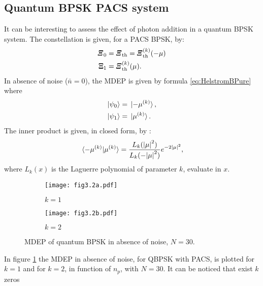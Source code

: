     \subsection{Quantum BPSK PACS system}
    It can be interesting to assess the effect of photon addition in a quantum BPSK system.
    The constellation is given, for a PACS BPSK, by:
    \begin{equation}\begin{split}
        \Operator{\varXi}_0 &=  \Operator{\varXi}_{\mathrm{th}} = \Operator{\varXi}_{\mathrm{th}}^{(k)}(-\mu)\\
        \Operator{\Xi}_1 &=  \Operator{\varXi}_{\mathrm{th}}^{(k)}(\mu).
    \end{split}\end{equation}
    In absence of noise ($\bar{n}=0$), the MDEP is given by formula \ref{eq:HelstromBPure} where
    \begin{equation}
        \begin{split}
            \ket{\psi_0}&=\ket*{-\mu^{(k)}},\\
            \ket{\psi_1}&=\ket*{\mu^{(k)}}.
        \end{split}
    \end{equation}
    The inner product is given, in closed form, by \cite{PACSDisc}:
    \begin{equation}
        \braket*{-\mu^{(k)}}{\mu^{(k)}} = \frac{L_k(\absolutevalue{\mu}^2)}{L_k(-\absolutevalue{\mu}^2)}
        e^{-2\absolutevalue{\mu}^2},
        \label{eq:innerp_nonNoise}
    \end{equation}
    where $L_k(x)$ is the Laguerre polynomial of parameter $k$, evaluate in $x$.
    \begin{figure}[t]
        \begin{subfigure}{0.5\textwidth}
            \texttt{[image: fig3.2a.pdf]}
            \caption{$k=1$}
        \end{subfigure}
        \begin{subfigure}{0.5\textwidth}
            \texttt{[image: fig3.2b.pdf]}
            \caption{$k=2$}
        \end{subfigure}
        \caption{MDEP of quantum BPSK in absence of noise, $N=30$.}
        \label{fig:3.2}
    \end{figure}
    In figure \ref{fig:3.2} the MDEP in absence of noise, for QBPSK with PACS, is plotted for
    $k=1$ and for $k=2$, in function of $n_p$, with $N=30$. It can be noticed that exist $k$ zeros
